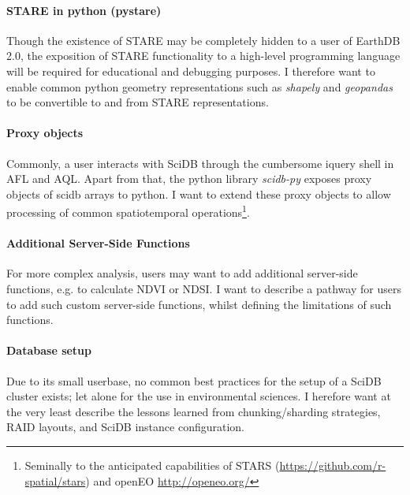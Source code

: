 \documentclass[letterpaper, parskip=half]{scrartcl}
\begin{document}
\paragraph{STARE in python (pystare)}
Though the existence of STARE may be completely hidden to a user of EarthDB 2.0, the exposition of STARE functionality to a high-level programming language will be required for educational and debugging purposes. I therefore want to enable common python geometry representations such as \textit{shapely} and \textit{geopandas} to be convertible to and from STARE representations.

\paragraph{Proxy objects}
Commonly, a user interacts with SciDB through the cumbersome iquery shell in \gls{AFL} and \gls{AQL}. 
Apart from that, the python library \textit{scidb-py} exposes proxy objects of scidb arrays to python. 
I want to extend these proxy objects to allow processing of common spatiotemporal operations\footnote{Seminally to the anticipated capabilities of STARS (\url{https://github.com/r-spatial/stars}) and openEO \url{http://openeo.org/}}.

\paragraph{Additional Server-Side Functions}
For more complex analysis, users may want to add additional server-side functions, e.g. to calculate \gls{NDVI} or \gls{NDSI}. I want to describe a pathway for users to add such custom server-side functions, whilst defining the limitations of such functions.

\paragraph{Database setup}
Due to its small userbase, no common best practices for the setup of a SciDB cluster exists; let alone for the use in environmental sciences. I herefore want at the very least describe the lessons learned from chunking/sharding strategies, RAID layouts, and SciDB instance configuration.



\end{document}
